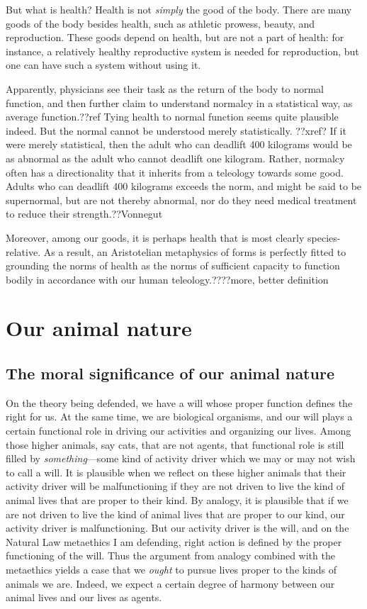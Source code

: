 But what is health? Health is not \textit{simply} the good of the body. There are many goods of the body besides health, such as
athletic prowess, beauty, and reproduction. These goods depend on health, but are not a part of health: for instance, a relatively healthy reproductive system is needed for
reproduction, but one can have such a system without using it.

Apparently, physicians see their task as the return of the body to normal function, and then further claim to understand normalcy in a statistical way, as average
function.??ref Tying health to normal function seems quite plausible indeed. But the normal cannot be understood merely statistically. ??xref? If it were merely
statistical, then the adult who can deadlift 400 kilograms would be as abnormal
as the adult who cannot deadlift one kilogram. Rather, normalcy often has a directionality that it inherits from a teleology towards some good. Adults who
can deadlift 400 kilograms exceeds the norm, and might be said to be supernormal, but are not thereby abnormal, nor do they need medical treatment to reduce their
strength.??Vonnegut

Moreover, among our goods, it is perhaps health that is most clearly species-relative. As a result, an Aristotelian metaphysics of forms is perfectly fitted to
grounding the norms of health as the norms of sufficient capacity to function bodily in accordance with our human teleology.????more, better definition

\section{Our animal nature}
\subsection{The moral significance of our animal nature}
On the theory being defended, we have a will whose proper function defines the right for us. At the same time, 
we are biological organisms, and our will plays a certain functional role in driving our activities and organizing our 
lives. Among those higher animals, say cats, that are not agents, that functional role is still filled by 
\textit{something}---some kind of activity driver which we may or may not wish to call a will. It is plausible when 
we reflect on these higher animals that their activity driver will be malfunctioning if they are not driven to live the kind
of animal lives that are proper to their kind. By analogy, it is plausible that if we are not driven to live the kind of animal lives
that are proper to our kind, our activity driver is malfunctioning. But our activity driver is the will, and on the Natural Law
metaethics I am defending, right action is defined by the proper functioning of the will. Thus the argument from analogy combined
with the metaethics yields a case that we \textit{ought} to pursue lives proper to the kinds of animals we are. Indeed, we expect
a certain degree of harmony between our animal lives and our lives as agents.

